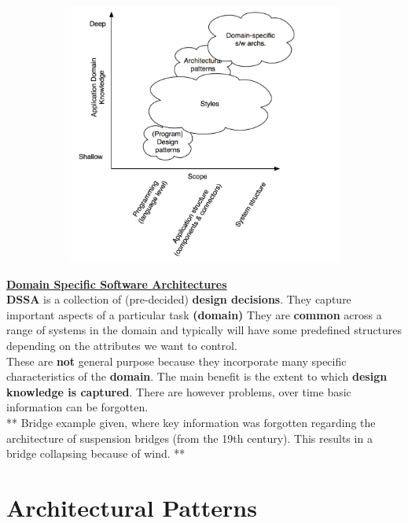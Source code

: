 \documentclass[a4paper]{report}
\begin{document}
\begin{figure}[H]
\hskip-2.5cm\begin{subfigure}{1\textwidth}
  \includegraphics[width=1\linewidth]
  {images/3-graph.png}
\end{subfigure}
\end{figure}

\underline{\textbf{Domain Specific Software Architectures}}\\
\textbf{DSSA} is a collection of (pre-decided) \textbf{design decisions}. They capture important aspects of a particular task \textbf{(domain)} They are \textbf{common} across a range of systems in the domain and typically will have some predefined structures depending on the attributes we want to control.\\

These are \textbf{not} general purpose because they incorporate many specific characteristics of the \textbf{domain}. The main benefit is the extent to which \textbf{design knowledge is captured}. There are however problems, over time basic information can be forgotten.\\

** Bridge example given, where key information was forgotten regarding the architecture of suspension bridges (from the 19th century). This results in a bridge collapsing because of wind. **
\section{Architectural Patterns}
\end{document}

